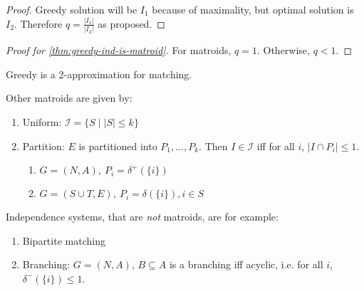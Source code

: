 \begin{proof}
    Greedy solution will be $I_1$ because of maximality, but optimal solution is $I_2$.
    Therefore $q = \frac{|I_1|}{|I_2|}$ as proposed.
\end{proof}
\begin{proof}[Proof for \autoref{thm:greedy-ind-is-matroid}]
    For matroids, $q=1$. Otherwise, $q < 1$.
\end{proof}
\begin{corollary}
    Greedy is a 2-approximation for matching.
\end{corollary}
\begin{example}
    Other matroids are given by:
    \begin{enumerate}
        \item Uniform: $\mathcal{I}=\{S \mid |S| \leq k\}$
        \item Partition: $E$ is partitioned into $P_1,...,P_k$. Then $I \in \mathcal{I}$ iff for all $i$, $|I \cap P_i| \leq 1$.
              \begin{enumerate}
                  \item  $G=(N,A),\ P_i = \delta^+(\{i\})$
                  \item  $G=(S \cup T,E),\ P_i=\delta(\{i\}), i \in S$
              \end{enumerate}
    \end{enumerate}
\end{example}
\begin{example}
    Independence systems, that are \emph{not} matroids, are for example:
    \begin{enumerate}
        \item Bipartite matching
        \item Branching: $G=(N,A)$, $B \subseteq A$ is a branching iff acyclic, i.e. for all $i$, $\delta^-(\{i\}) \leq 1$.
    \end{enumerate}
\end{example}

